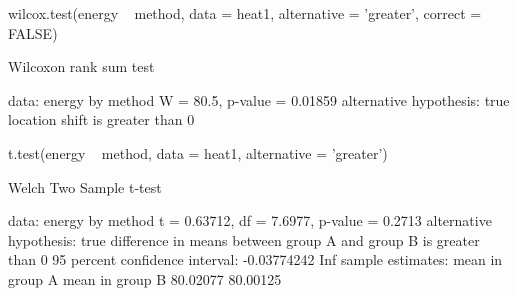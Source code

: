 \documentclass[a4paper]{article}\usepackage[]{graphicx}\usepackage[]{xcolor}
\begin{document}
\begin{Schunk}
\begin{Sinput}
wilcox.test(energy ~ method, data = heat1, alternative = 'greater', correct = FALSE)
\end{Sinput}
\begin{Soutput}

	Wilcoxon rank sum test

data:  energy by method
W = 80.5, p-value = 0.01859
alternative hypothesis: true location shift is greater than 0
\end{Soutput}
\end{Schunk}
\begin{Schunk}
\begin{Sinput}
t.test(energy ~ method, data = heat1, alternative = 'greater')
\end{Sinput}
\begin{Soutput}

	Welch Two Sample t-test

data:  energy by method
t = 0.63712, df = 7.6977, p-value = 0.2713
alternative hypothesis: true difference in means between group A and group B is greater than 0
95 percent confidence interval:
 -0.03774242         Inf
sample estimates:
mean in group A mean in group B 
       80.02077        80.00125 
\end{Soutput}
\end{Schunk}
\end{document}
